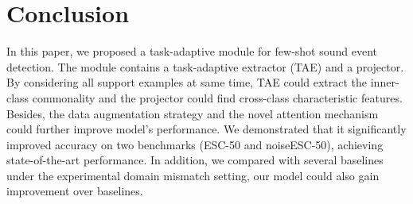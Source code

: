 \documentclass[a4paper]{article}
\begin{document}
\section{Conclusion}
\vspace{-1mm}
In this paper, we proposed a task-adaptive module for few-shot sound event detection. The module contains a task-adaptive extractor (TAE) and a projector. By considering all support examples at same time, TAE could extract the inner-class commonality and the projector could find cross-class characteristic features. Besides, the data augmentation strategy and the novel attention mechanism could further improve model’s performance. We demonstrated that it significantly improved accuracy on two benchmarks (ESC-50 and noiseESC-50), achieving state-of-the-art performance. In addition, we compared with several baselines under the experimental domain mismatch setting, our model could also gain improvement over baselines.



\end{document}
